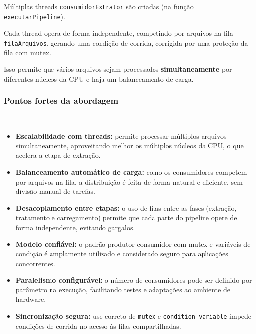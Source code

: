 \documentclass[a4paper,12pt]{article}
\begin{document}
Múltiplas threads \texttt{consumidorExtrator} são criadas (na função \texttt{executarPipeline}).

Cada thread opera de forma independente, competindo por arquivos na fila \texttt{filaArquivos}, gerando uma condição de corrida, corrigida por uma proteção da fila com mutex.
 
Isso permite que vários arquivos sejam processados \textbf{simultaneamente} por diferentes núcleos da CPU e haja um balanceamento de carga.
\\
\subsubsection*{Pontos fortes da abordagem}
\\
\begin{itemize}
    \item \textbf{Escalabilidade com threads:} permite processar múltiplos arquivos simultaneamente, aproveitando melhor os múltiplos núcleos da CPU, o que acelera a etapa de extração.

    \item \textbf{Balanceamento automático de carga:} como os consumidores competem por arquivos na fila, a distribuição é feita de forma natural e eficiente, sem divisão manual de tarefas.

    \item \textbf{Desacoplamento entre etapas:} o uso de filas entre as fases (extração, tratamento e carregamento) permite que cada parte do pipeline opere de forma independente, evitando gargalos.

    \item \textbf{Modelo confiável:} o padrão produtor-consumidor com mutex e variáveis de condição é amplamente utilizado e considerado seguro para aplicações concorrentes.

    \item \textbf{Paralelismo configurável:} o número de consumidores pode ser definido por parâmetro na execução, facilitando testes e adaptações ao ambiente de hardware.

    \item \textbf{Sincronização segura:} uso correto de \texttt{mutex} e \texttt{condition\_variable} impede condições de corrida no acesso às filas compartilhadas.
\end{itemize}

\vspace{1em}

\\
\end{document}
